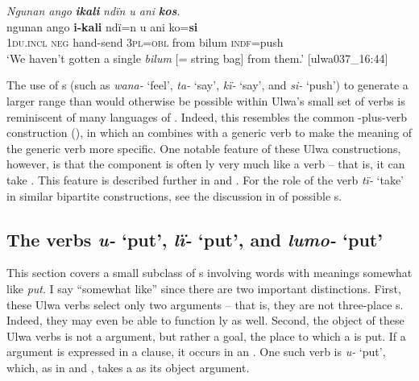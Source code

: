 \ea%
    \label{ex:phrase:72}
          \textit{Ngunan ango} \textbf{\textit{ikali}} \textit{ndïn u ani} \textbf{\textit{kos}}.\\
\gll ngunan    ango  \textbf{i-kali}    ndï=n    u    ani    ko=\textbf{si}\\
    \textsc{1du.incl}  \textsc{neg}  hand-send  3\textsc{pl=obl}  from  bilum  \textsc{indf}=push\\
\glt `We haven’t gotten a single \textit{bilum} [= string bag] from them.’ [ulwa037\_16:44]
\z

The use of s (such as \textit{wana-} ‘feel’, \textit{ta-} ‘say’, \textit{kï-} ‘say’, and \textit{si-} ‘push’) to generate a larger  range than would otherwise be possible within Ulwa’s small set of verbs is reminiscent of many languages of . Indeed, this resembles the common -plus-verb construction (\citealt[117--128]{Foley1986}), in which an  combines with a generic verb to make the meaning of the generic verb more specific. One notable feature of these Ulwa constructions, however, is that the  component is often ly very much like a verb -- that is, it can take . This feature is described further in  and . For the role of the verb \textit{tï-} ‘take’ in similar bipartite constructions, see the discussion in  of possible s.


\subsection{The verbs \textit{u-} ‘put’, \textit{lï-} ‘put’, and \textit{lumo-} ‘put’}\label{sec:9.2.2}


This section covers a small subclass of s involving words with meanings somewhat like  \textit{put}. I say “somewhat like” since there are two important  distinctions. First, these Ulwa verbs select only two arguments -- that is, they are not three-place s. Indeed, they may even be able to function ly as well. Second, the object of these Ulwa verbs is not a  argument, but rather a goal, the place to which a  is put. If a  argument is expressed in a clause, it occurs in an  . One such verb is \textit{u-} ‘put’, which, as in  and , takes a  as its object argument.


